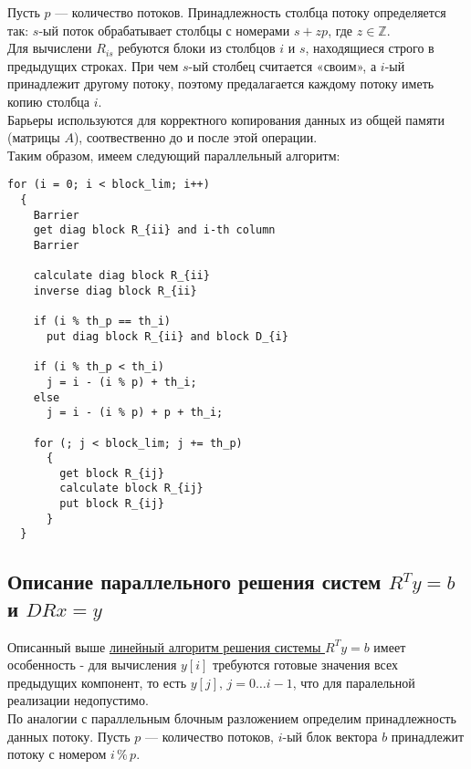 \documentclass[a4paper,12pt]{article}
\begin{document}
    Пусть $p$ --- количество потоков. Принадлежность столбца потоку определяется так:
    $s$-ый поток обрабатывает столбцы с номерами $s + zp$, где $z \in \mathbb{Z}$. \\
    
    Для вычислени $R_{is}$ ребуются блоки из столбцов $i$ и $s$, находящиеся строго в предыдущих строках. 
    При чем $s$-ый столбец считается «своим», а $i$-ый принадлежит 
    другому потоку, поэтому предалагается каждому потоку иметь копию столбца $i$. \\
    
    Барьеры используются для корректного копирования данных из общей памяти (матрицы $A$),
    соотвественно до и после этой операции. \\
    
    Таким образом, имеем 
    \hypertarget{paral_alg}{следующий параллельный алгоритм}: 

\begin{verbatim}
for (i = 0; i < block_lim; i++)
  {
    Barrier
    get diag block R_{ii} and i-th column
    Barrier
    
    calculate diag block R_{ii}
    inverse diag block R_{ii}
    
    if (i % th_p == th_i)
      put diag block R_{ii} and block D_{i}
        
    if (i % th_p < th_i)
      j = i - (i % p) + th_i;
    else
      j = i - (i % p) + p + th_i;
        
    for (; j < block_lim; j += th_p)
      {
        get block R_{ij}
        calculate block R_{ij}
        put block R_{ij}
      }
  }
\end{verbatim}


\subsection{Описание параллельного решения систем $R^T y = b$ и $DRx = y$}

    Описанный выше 
    \hyperlink{calc_y}{линейный алгоритм решения системы $R^T y = b$} 
    имеет особенность - для вычисления $y[i]$ 
    \hypertarget{reason}{требуются готовые значения всех предыдущих компонент}, 
    то есть $y[j],\, j = 0 \dots i-1$, что для паралельной реализации недопустимо. \\
    
    По аналогии с параллельным блочным разложением определим принадлежность данных потоку.
    Пусть $p$ --- количество потоков, $i$-ый блок вектора $b$ принадлежит потоку 
    с номером $i\,\%\, p$. \\
    
\end{document}
